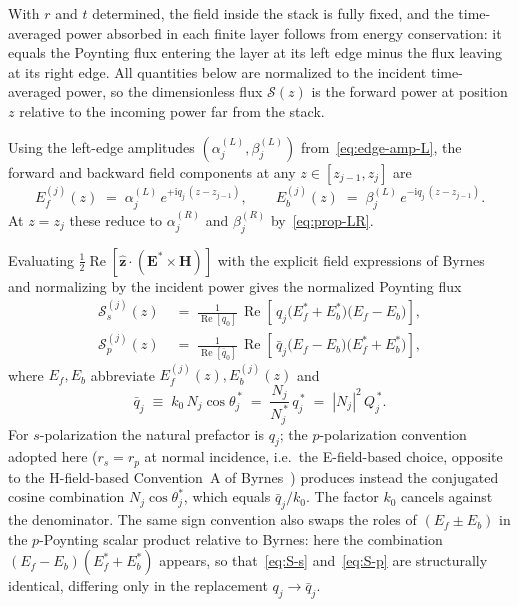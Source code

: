 \documentclass[aps,prb,onecolumn,superscriptaddress,nofootinbib,11pt]{revtex4-2}
\newcommand{\ii}{\mathrm{i}}
\DeclareMathOperator{\Rey}{Re}
\begin{document}
With $r$ and $t$ determined, the field inside the stack is fully fixed, and the time-averaged power absorbed in each finite layer follows from energy conservation: it equals the Poynting flux entering the layer at its left edge minus the flux leaving at its right edge. All quantities below are normalized to the incident time-averaged power, so the dimensionless flux $\mathcal{S}(z)$ is the forward power at position $z$ relative to the incoming power far from the stack.

Using the left-edge amplitudes $(\alpha_j^{(L)}, \beta_j^{(L)})$ from~\eqref{eq:edge-amp-L}, the forward and backward field components at any $z \in [z_{j-1}, z_j]$ are
\begin{equation}
  E_f^{(j)}(z) \;=\; \alpha_j^{(L)}\, e^{+\ii q_j\,(z - z_{j-1})},
  \qquad
  E_b^{(j)}(z) \;=\; \beta_j^{(L)}\, e^{-\ii q_j\,(z - z_{j-1})}.
  \label{eq:abs-fields}
\end{equation}
At $z = z_j$ these reduce to $\alpha_j^{(R)}$ and $\beta_j^{(R)}$ by~\eqref{eq:prop-LR}.

Evaluating $\tfrac{1}{2}\Rey[\hat{\mathbf{z}}\cdot(\mathbf{E}^*\times\mathbf{H})]$ with the explicit field expressions of Byrnes~\cite[Eqs.~(4)--(5)]{Byrnes2020} and normalizing by the incident power gives the normalized Poynting flux
\begin{align}
  \mathcal{S}_s^{(j)}(z)
  &\;=\; \frac{1}{\Rey[q_0]}\,
  \Rey\!\left[\,q_j \bigl(E_f^* + E_b^*\bigr)\bigl(E_f - E_b\bigr)\right],
  \label{eq:S-s}\\[2pt]
  \mathcal{S}_p^{(j)}(z)
  &\;=\; \frac{1}{\Rey[\bar q_0]}\,
  \Rey\!\left[\,\bar q_j \bigl(E_f - E_b\bigr)\bigl(E_f^* + E_b^*\bigr)\right],
  \label{eq:S-p}
\end{align}
where $E_f, E_b$ abbreviate $E_f^{(j)}(z), E_b^{(j)}(z)$ and
\begin{equation}
  \bar q_j \;\equiv\; k_0\, N_j \cos\theta_j^{\,*}
  \;=\; \frac{N_j}{N_j^{\,*}}\, q_j^{\,*}
  \;=\; |N_j|^{2}\, Q_j^{\,*}.
  \label{eq:qbar-def}
\end{equation}
For $s$-polarization the natural prefactor is $q_j$; the $p$-polarization convention adopted here ($r_s = r_p$ at normal incidence, i.e.\ the E-field-based choice, opposite to the H-field-based Convention~A of Byrnes~\cite{Byrnes2020}) produces instead the conjugated cosine combination $N_j\cos\theta_j^*$, which equals $\bar{q}_j/k_0$. The factor $k_0$ cancels against the denominator. The same sign convention also swaps the roles of $(E_f \pm E_b)$ in the $p$-Poynting scalar product relative to Byrnes: here the combination $(E_f - E_b)(E_f^* + E_b^*)$ appears, so that~\eqref{eq:S-s} and~\eqref{eq:S-p} are structurally identical, differing only in the replacement $q_j \to \bar{q}_j$.
\end{document}
